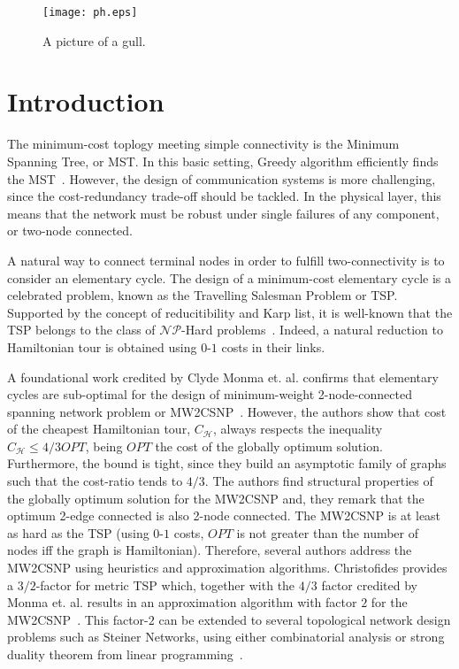 \documentclass{endm}
\begin{document}
\begin{figure}
  \caption{A picture of a gull.}
  \centering
    \texttt{[image: ph.eps]}
\end{figure}
\section{Introduction}\label{intro}
The minimum-cost toplogy meeting simple connectivity is the Minimum Spanning Tree, or MST. In this basic setting, Greedy algorithm efficiently finds the MST~\cite{Kruskal}.
However, the design of communication systems is more challenging, since the cost-redundancy trade-off should be tackled.
In the physical layer, this means that the network must be robust under single failures of any component, or two-node connected.

A natural way to connect terminal nodes in order to fulfill two-connectivity is to consider an elementary cycle. The design of a minimum-cost
elementary cycle is a celebrated problem, known as the Travelling Salesman Problem or TSP. Supported by the concept of reducitibility
and Karp list, it is well-known that the TSP belongs to the class of $\mathcal{NP}$-Hard problems~\cite{Karp72}.
Indeed, a natural reduction to Hamiltonian tour is obtained using $0$-$1$ costs in their links.

A foundational work credited by Clyde Monma et. al. confirms that elementary cycles are sub-optimal for the design of
minimum-weight 2-node-connected spanning network problem or MW2CSNP~\cite{monma1990minimum}.
However, the authors show that cost of the cheapest Hamiltonian tour, $C_{\mathcal{H}}$, always respects the inequality
$C_{\mathcal{H}} \leq 4/3 OPT$, being $OPT$ the cost of the globally optimum solution.
Furthermore, the bound is tight, since they build an asymptotic family of graphs such that the cost-ratio tends to $4/3$. The authors find structural properties of the globally optimum
solution for the MW2CSNP and, they remark that the optimum 2-edge connected is also
2-node connected. The MW2CSNP is at least as hard as the TSP (using $0$-$1$ costs, $OPT$ is not greater than the number of nodes
iff the graph is Hamiltonian). Therefore, several authors address the MW2CSNP using heuristics and approximation algorithms.
Christofides provides a $3/2$-factor for metric TSP which, together with the $4/3$ factor credited by
Monma et. al. results in an approximation algorithm with factor $2$ for the MW2CSNP~\cite{christofides}. This factor-$2$ can be extended to
several topological network design problems such as Steiner Networks, using either combinatorial analysis or strong duality
theorem from linear programming~\cite{vazirani2003approximation,GW}.
\end{document}
